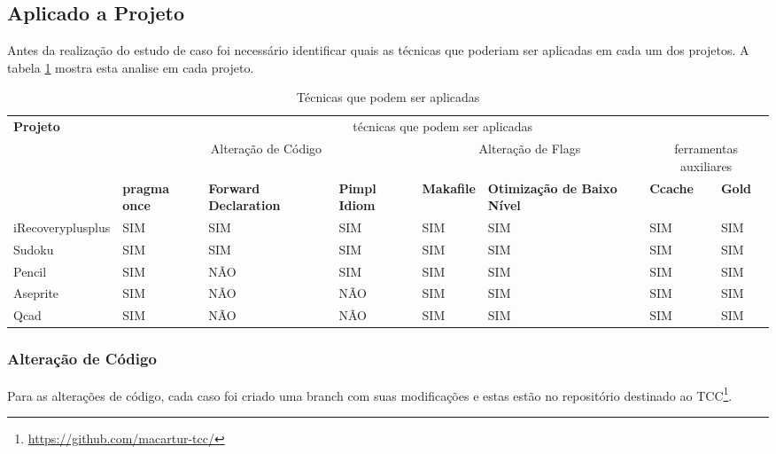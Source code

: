 \subsection{Aplicado a Projeto}

Antes da realização do estudo de caso foi necessário identificar quais
 as técnicas que poderiam ser aplicadas em cada um dos projetos.
 A tabela \ref{tecnicas_que_podem_ser_aplicadas} mostra esta analise em cada projeto.


\begin{table}[h]
\tiny
\begin{tabular}{p{2cm}p{2cm}p{2cm}p{2cm}p{2cm}p{2cm}p{2cm}p{2cm}}

\textbf{Projeto} & \multicolumn{7}{c}{técnicas que podem ser aplicadas} \\ 
 & \multicolumn{3}{c}{Alteração de Código} & \multicolumn{2}{c}{Alteração de Flags} & \multicolumn{2}{c}{ferramentas auxiliares}  \\ \toprule
& \textbf{pragma once} & \textbf{Forward Declaration} & \textbf{Pimpl Idiom} & \textbf{Makafile} &
 \textbf{Otimização de Baixo Nível} & \textbf{Ccache} & \textbf{Gold} \\ 
iRecoveryplusplus & SIM & SIM & SIM &  SIM & SIM & SIM & SIM \\ 
Sudoku &  SIM & SIM & SIM & SIM & SIM & SIM & SIM \\ 
Pencil & SIM & NÃO &  SIM & SIM & SIM & SIM & SIM \\ 
Aseprite &  SIM & NÃO & NÃO & SIM & SIM & SIM & SIM \\ 
Qcad &  SIM & NÃO & NÃO & SIM & SIM & SIM & SIM \\ \bottomrule
\end{tabular} 
\caption{Técnicas que podem ser aplicadas}
\label{tecnicas_que_podem_ser_aplicadas}
\end{table}

\subsubsection{Alteração de Código}

 Para as alterações de código, cada caso foi criado
 uma branch com suas modificações e estas estão no repositório
 destinado ao TCC\footnote{\url{https://github.com/macartur-tcc/}}.


